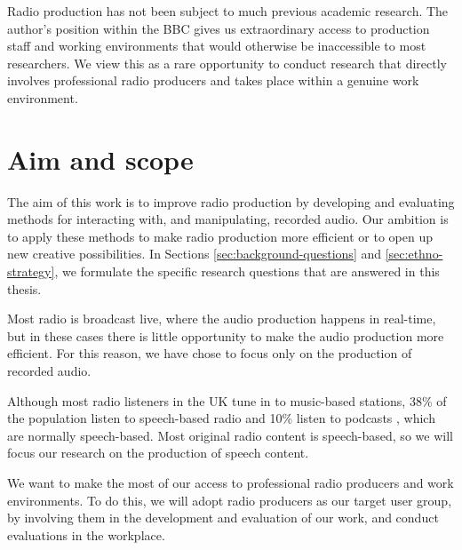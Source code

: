 Radio production has not been subject to much previous academic research.  The author's position within the BBC gives
us extraordinary access to production staff and working environments that would otherwise be inaccessible to most
researchers. We view this as a rare opportunity to conduct research that directly involves professional radio producers
and takes place within a genuine work environment.


\section{Aim and scope}\label{sec:aim}

The aim of this work is to improve radio production by developing and evaluating methods for interacting with, and
manipulating, recorded audio.  Our ambition is to apply these methods to make radio production more efficient or to
open up new creative possibilities.  In Sections \ref{sec:background-questions} and \ref{sec:ethno-strategy}, we
formulate the specific research questions that are answered in this thesis.

Most radio is broadcast live, where the audio production happens in real-time, but in these cases there is little 
opportunity to make the audio production more efficient. For this reason, we have chose to focus only on the production
of recorded audio.

Although most radio listeners in the UK tune in to music-based stations, 38\% of the population listen to speech-based
radio \citep[pp.  97, 105]{Ofcom2017} and 10\% listen to podcasts \citep{RAJAR2017}, which are normally speech-based.
Most original radio content is speech-based, so we will focus our research on the production of speech content.

We want to make the most of our access to professional radio producers and work environments.  To do this, we will
adopt radio producers as our target user group, by involving them in the development and evaluation of our work, and
conduct evaluations in the workplace.


